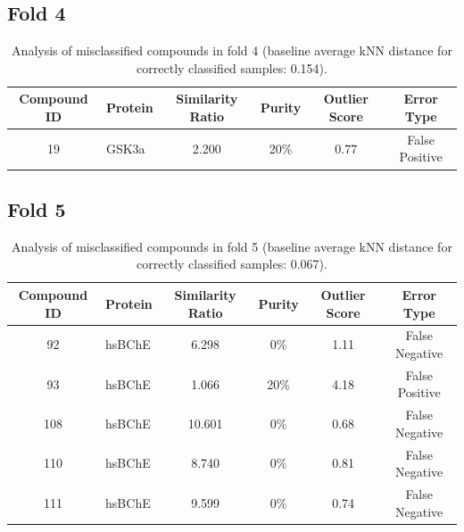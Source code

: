 \documentclass{article}
\newenvironment{smarttabular}[1]{%
    \begin{tabular}{#1}%
}{%
    \end{tabular}%
}
\begin{document}
\clearpage

\subsection{Fold 4}

\begin{table}[H]
    \centering
    \small
    \caption{Analysis of misclassified compounds in fold 4 (baseline average kNN distance for correctly classified samples: 0.154).}
    \label{tab:misclassified_compounds_4}
    \begin{smarttabular}{clcccc}
        \toprule
        \textbf{Compound ID} & \textbf{Protein} & \textbf{Similarity Ratio} & \textbf{Purity} & \textbf{Outlier Score} & \textbf{Error Type} \\
        \midrule
        19 & GSK3a & 2.200 & 20\% & 0.77 & False Positive \\
        \bottomrule
    \end{smarttabular}
\end{table}

\clearpage

\subsection{Fold 5}

\begin{table}[H]
    \centering
    \small
    \caption{Analysis of misclassified compounds in fold 5 (baseline average kNN distance for correctly classified samples: 0.067).}
    \label{tab:misclassified_compounds_5}
    \begin{smarttabular}{clcccc}
        \toprule
        \textbf{Compound ID} & \textbf{Protein} & \textbf{Similarity Ratio} & \textbf{Purity} & \textbf{Outlier Score} & \textbf{Error Type} \\
        \midrule
        92 & hsBChE & 6.298 & 0\% & 1.11 & False Negative \\
        93 & hsBChE & 1.066 & 20\% & 4.18 & False Positive \\
        108 & hsBChE & 10.601 & 0\% & 0.68 & False Negative \\
        110 & hsBChE & 8.740 & 0\% & 0.81 & False Negative \\
        111 & hsBChE & 9.599 & 0\% & 0.74 & False Negative \\
        \bottomrule
    \end{smarttabular}
\end{table}
\end{document}
